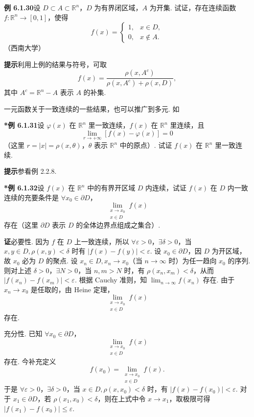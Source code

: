 \documentclass[UTF8, 12pt, fontset=fandol, oneside]{ctexart}
\begin{document}
\noindent\textbf{例 6.1.30}\quad 设 $D\subset A\subset\mathbb{R}^n$，$D$ 为有界闭区域，$A$ 为开集. 试证，存在连续函数 $f:\mathbb{R}^n\to[0,1]$，使得
\[
  f(x)=
  \begin{cases}
  1, & x\in D,\\
  0, & x\notin A.
  \end{cases}
\]
（西南大学）

\noindent\textbf{提示}\quad 利用上例的结果与符号，可取
\[
  f(x)=\frac{\rho(x,A^c)}{\rho(x,A^c)+\rho(x,D)},
\]
其中 $A^c=\mathbb{R}^n-A$ 表示 $A$ 的补集.

一元函数关于一致连续的一些结果，也可以推广到多元. 如

\noindent\textbf{*例 6.1.31}\quad 设 $\varphi(x)$ 在 $\mathbb{R}^n$ 里一致连续，$f(x)$ 在 $\mathbb{R}^n$ 里连续，且
\[
  \lim_{r\to+\infty}[f(x)-\varphi(x)]=0
\]
（这里 $r=|x|=\rho(x,\theta)$，$\theta$ 表示 $\mathbb{R}^n$ 中的原点）. 试证 $f(x)$ 在 $\mathbb{R}^n$ 里一致连续.

\noindent\textbf{提示}\quad 参看例 2.2.8.

\noindent\textbf{*例 6.1.32}\quad 设 $f(x)$ 在 $\mathbb{R}^n$ 中的有界开区域 $D$ 内连续，试证 $f(x)$ 在 $D$ 内一致连续的充要条件是 $\forall x_0\in\partial D$，
\[
  \lim_{\substack{x\to x_0\\ x\in D}}f(x)
\]
存在（这里 $\partial D$ 表示 $D$ 的全体边界点组成之集合）.

\noindent\textbf{证}\quad 必要性. 因为 $f$ 在 $D$ 上一致连续，所以 $\forall\varepsilon>0$，$\exists\delta>0$，当 $x,y\in D,\rho(x,y)<\delta$ 时有 $|f(x)-f(y)|<\varepsilon$. 设 $x_0\in\partial D$，因 $D$ 为开区域，故 $x_0$ 必为 $D$ 的聚点. 设 $x_n\in D,x_n\to x_0$（当 $n\to\infty$ 时）为任一趋向 $x_0$ 的序列. 则对上述 $\delta>0$，$\exists N>0$，当 $n,m>N$ 时，有 $\rho(x_n,x_m)<\delta$，从而 $|f(x_n)-f(x_m)|<\varepsilon$. 根据 Cauchy 准则，知 $\displaystyle\lim_{n\to\infty}f(x_n)$ 存在. 由于 $x_n\to x_0$ 是任取的，由 Heine 定理，
\[
  \lim_{\substack{x\to x_0\\ x\in D}}f(x)
\]
存在.

充分性. 已知 $\forall x_0\in\partial D$，
\[
  \lim_{\substack{x\to x_0\\ x\in D}}f(x)
\]
存在. 今补充定义
\[
  f(x_0)=\lim_{\substack{x\to x_0\\ x\in D}}f(x).
\]
于是 $\forall\varepsilon>0$，$\exists\delta>0$，当 $x\in D,\rho(x,x_0)<\delta$ 时，有 $|f(x)-f(x_0)|<\varepsilon$. 对于 $x_1\in\partial D$，若 $\rho(x_1,x_0)<\delta$，则在上式中令 $x\to x_1$，取极限可得 $|f(x_1)-f(x_0)|\le\varepsilon$.
\end{document}
